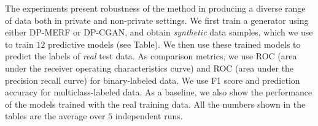 \documentclass{article}
\begin{document}
The experiments present robustness of the method in producing a diverse range of data both in private and non-private settings.
%
We first train a generator using either DP-MERF or DP-CGAN, and obtain \textit{synthetic} data samples, which we use to train $12$ predictive models (see Table). We then use these trained models to predict the labels of \textit{real} test data.
%
As comparison metrics, we use ROC (area under the receiver operating characteristics curve) and ROC (area under the precision recall curve) for binary-labeled data. We use F1 score and prediction accuracy for multiclass-labeled data. 
%
As a baseline, we also show the performance of the models trained with the real training data. All the numbers shown in the tables are the average over $5$ independent runs. 


\begin{table}[t]
\caption{Tabular datasets. num refers to numerical, cat refers to categorical, and ord refers to ordinal variables}
\label{tab:data_description}
\vskip 0.1in
\centering
{}
\end{table}
\end{document}
